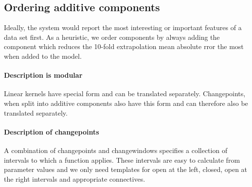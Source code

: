 \documentclass{article}
\begin{document}


\subsection{Ordering additive components}

Ideally, the system would report the most interesting or important features of a data set first.
As a heuristic, we order components by always adding the component which reduces the 10-fold extrapolation mean absolute rror the most when added to the model.





\paragraph{Description is modular}

Linear kernels have special form and can be translated separately.
Changepoints, when split into additive components also have this form and can therefore also be translated separately.

\paragraph{Description of changepoints}

A combination of changepoints and changewindows specifies a collection of intervals to which a function applies.
These intervals are easy to calculate from parameter values and we only need templates for open at the left, closed, open at the right intervals  and appropriate connectives.
\end{document}
